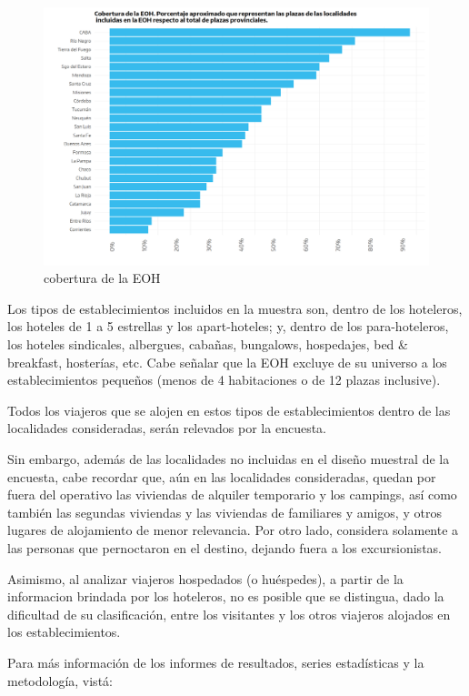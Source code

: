 \documentclass[
  openany]{book}
\begin{document}
\begin{figure}

{\centering \includegraphics[width=0.8\linewidth]{imagenes/figura2.2} 

}

\caption{cobertura de la EOH}\label{fig:cobertura}
\end{figure}

Los tipos de establecimientos incluidos en la muestra son, dentro de los hoteleros, los hoteles de 1 a 5 estrellas y los apart-hoteles; y, dentro de los para-hoteleros, los hoteles sindicales, albergues, cabañas, bungalows, hospedajes, bed \& breakfast, hosterías, etc.
Cabe señalar que la EOH excluye de su universo a los establecimientos pequeños (menos de 4 habitaciones o de 12 plazas inclusive).

Todos los viajeros que se alojen en estos tipos de establecimientos dentro de las localidades consideradas, serán relevados por la encuesta.

Sin embargo, además de las localidades no incluidas en el diseño muestral de la encuesta, cabe recordar que, aún en las localidades consideradas, quedan por fuera del operativo las viviendas de alquiler temporario y los campings, así como también las segundas viviendas y las viviendas de familiares y amigos, y otros lugares de alojamiento de menor relevancia.
Por otro lado, considera solamente a las personas que pernoctaron en el destino, dejando fuera a los excursionistas.

Asimismo, al analizar viajeros hospedados (o huéspedes), a partir de la informacion brindada por los hoteleros, no es posible que se distingua, dado la dificultad de su clasificación, entre los visitantes y los otros viajeros alojados en los establecimientos.

Para más información de los informes de resultados, series estadísticas y la metodología, vistá:
\end{document}

